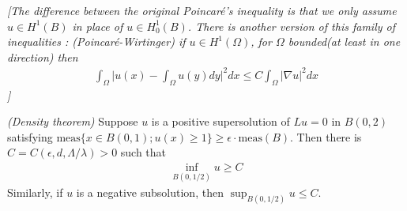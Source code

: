 \documentclass[12pt,a4paper]{article}
\begin{document}
\emph{[The difference between the original Poincar\'e's inequality is that we only assume $u\in H^1(B)$ in place of $u\in H_0^1(B)$. There is another version of this family of inequalities : (Poincar\'e-Wirtinger) if $u\in H^1(\Omega)$, for $\Omega$ bounded(at least in one direction) then
\begin{align*}
\int_{\Omega} \big| u(x) - \int_{\Omega} u(y) dy \big|^2 dx \leq C \int_{\Omega} |\nabla u|^2 dx
\end{align*}
]}
\s

\prop \emph{(Density theorem)} Suppose $u$ is a positive supersolution of $Lu =0$ in $B(0, 2)$ satisfying $\text{meas}\{x\in B(0,1) ; u(x) \geq 1 \} \geq \epsilon \cdot \text{meas}(B)$. Then there is $C= C(\epsilon, d, \Lambda/\lambda) >0$ such that
\begin{align*}
\inf_{B(0, 1/2)} u \geq C
\end{align*}
\quad Similarly, if $u$ is a negative subsolution, then $\sup_{B(0, 1/2)} u \leq C$.
\end{document}
